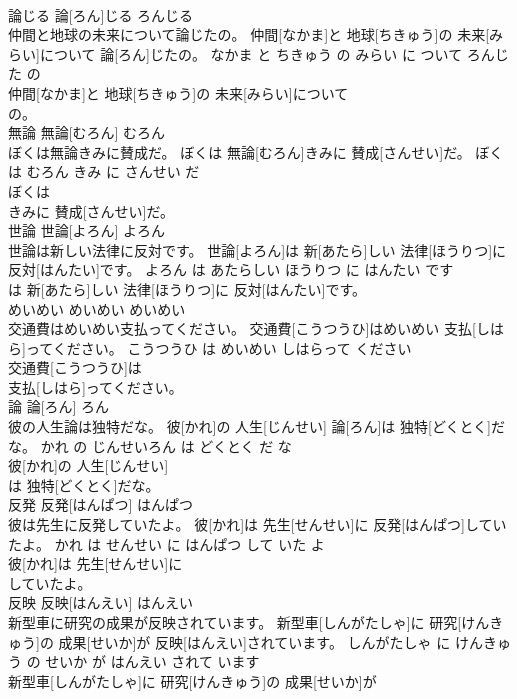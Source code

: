 \documentclass[8pt]{extreport}
\begin{document}
\begin{CJK}{UTF8}{min}
\\	論じる	論[ろん]じる	ろんじる	
\\	仲間と地球の未来について論じたの。	仲間[なかま]と 地球[ちきゅう]の 未来[みらい]について 論[ろん]じたの。	なかま と ちきゅう の みらい に ついて ろんじた の	
\\	仲間[なかま]と 地球[ちきゅう]の 未来[みらい]について
\\	の。			
\\	無論	無論[むろん]	むろん	
\\	ぼくは無論きみに賛成だ。	ぼくは 無論[むろん]きみに 賛成[さんせい]だ。	ぼく は むろん きみ に さんせい だ	
\\	ぼくは
\\	きみに 賛成[さんせい]だ。			
\\	世論	世論[よろん]	よろん	
\\	世論は新しい法律に反対です。	世論[よろん]は 新[あたら]しい 法律[ほうりつ]に 反対[はんたい]です。	よろん は あたらしい ほうりつ に はんたい です	
\\	は 新[あたら]しい 法律[ほうりつ]に 反対[はんたい]です。			
\\	めいめい	めいめい	めいめい	
\\	交通費はめいめい支払ってください。	交通費[こうつうひ]はめいめい 支払[しはら]ってください。	こうつうひ は めいめい しはらって ください	
\\	交通費[こうつうひ]は
\\	支払[しはら]ってください。			
\\	論	論[ろん]	ろん	
\\	彼の人生論は独特だな。	彼[かれ]の 人生[じんせい] 論[ろん]は 独特[どくとく]だな。	かれ の じんせいろん は どくとく だ な	
\\	彼[かれ]の 人生[じんせい]
\\	は 独特[どくとく]だな。			
\\	反発	反発[はんぱつ]	はんぱつ	
\\	彼は先生に反発していたよ。	彼[かれ]は 先生[せんせい]に 反発[はんぱつ]していたよ。	かれ は せんせい に はんぱつ して いた よ	
\\	彼[かれ]は 先生[せんせい]に
\\	していたよ。			
\\	反映	反映[はんえい]	はんえい	
\\	新型車に研究の成果が反映されています。	新型車[しんがたしゃ]に 研究[けんきゅう]の 成果[せいか]が 反映[はんえい]されています。	しんがたしゃ に けんきゅう の せいか が はんえい されて います	
\\	新型車[しんがたしゃ]に 研究[けんきゅう]の 成果[せいか]が

\end{CJK}
\end{document}
